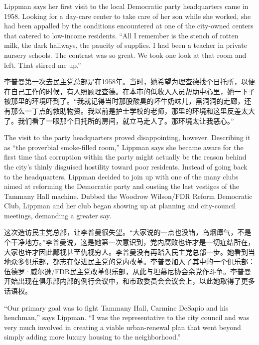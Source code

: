 \ifdefined\eng
Lippman says her first visit to the local Democratic party headquarters came in 1958. Looking for a day-care center to take care of her son while she worked, she had been appalled by the conditions encountered at one of the city-owned centers that catered to low-income residents. ``All I remember is the stench of rotten milk, the dark hallways, the paucity of supplies. I had been a teacher in private nursery schools. The contrast was so great. We took one look at that room and left. That stirred me up.''
\fi

\ifdefined\chs
李普曼第一次去民主党总部是在1958年。当时，她希望为理查德找个日托所，以便在自己工作的时候，有人照顾理查德。在本市的低收入人员帮助中心里，她一下子被那里的环境吓到了。``我就记得当时那股酸臭的坏牛奶味儿，黑洞洞的走廊，还有那么一丁点的救助物资。我以前是护士学校的老师，那里的环境和这里反差太大了。我们看了一眼那个日托所的房间，就立马走人了。那环境太让我恶心。''
\fi

\ifdefined\eng
The visit to the party headquarters proved disappointing, however. Describing it as ``the proverbial smoke-filled room,'' Lippman says she became aware for the first time that corruption within the party might actually be the reason behind the city's thinly disguised hostility toward poor residents. Instead of going back to the headquarters, Lippman decided to join up with one of the many clubs aimed at reforming the Democratic party and ousting the last vestiges of the Tammany Hall machine. Dubbed the Woodrow Wilson/FDR Reform Democratic Club, Lippman and her club began showing up at planning and city-council meetings, demanding a greater say.
\fi

\ifdefined\chs
这次造访民主党总部，让李普曼很失望。``大家说的一点也没错，乌烟瘴气，不是个干净地方。''李普曼说，这是她第一次意识到，党内腐败也许才是一切症结所在，大家也许才因此鄙视甚至仇视穷人。李普曼没有再踏入民主党总部一步。她看到当地众多俱乐部，都志在促进民主党的党内改革。李普曼加入了其中的一个俱乐部：伍德罗·威尔逊/FDR民主党改革俱乐部，从此与坦慕尼协会余党作斗争。李普曼开始出现在俱乐部内部的例行会议中，和市政委员会会议会上，以此她取得了更多话语权。
\fi

\ifdefined\eng
``Our primary goal was to fight Tammany Hall, Carmine DeSapio and his henchman,'' says Lippman. ``I was the representative to the city council and was very much involved in creating a viable urban-renewal plan that went beyond simply adding more luxury housing to the neighborhood.''
\fi

